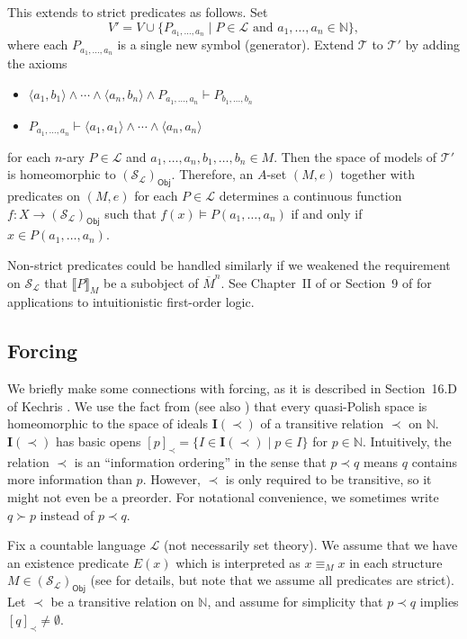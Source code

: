 \documentclass{article}
\theoremstyle{plain}
\def\cal#1{{\mathcal #1}}
\def\IN{{\mathbb N}}
\def\I#1{{{\mathrm{\mathbf I}}(#1)}}
\def\calL{{\cal L}}
\def\calS{{\cal S}}
\def\calT{{\cal T}}
\newcommand{\Obj}{\mathsf{Obj}}
\begin{document}
This extends to strict predicates as follows. Set
\[V' = V\cup\{ P_{a_1,\ldots, a_n} \mid P\in\calL \text{ and } a_1,\ldots,a_n \in\IN\},\]
where each $P_{a_1,\ldots, a_n}$ is a single new symbol (generator). Extend $\calT$ to $\calT'$ by adding the axioms
\begin{itemize}
\item
$\langle a_1,b_1 \rangle\wedge\cdots\wedge \langle a_n,b_n \rangle \wedge P_{a_1,\ldots,a_n}\vdash P_{b_1,\ldots,b_n}$
\item
$P_{a_1,\ldots,a_n} \vdash \langle a_1,a_1 \rangle\wedge\cdots\wedge \langle a_n,a_n\rangle$
\end{itemize}
for each $n$-ary $P\in\calL$ and $a_1,\ldots,a_n,b_1,\ldots,b_n\in M$. Then the space of models of $\calT'$ is homeomorphic to $(\calS_\calL)_\Obj$. Therefore, an $A$-set $(M,e)$ together with predicates on $(M,e)$ for each $P\in\calL$ determines a continuous function $f\colon X \to (\calS_\calL)_\Obj$ such that $f(x) \vDash P(a_1,\ldots,a_n)$ if and only if $x \in P(a_1,\ldots,a_n)$.

Non-strict predicates could be handled similarly if we weakened the requirement on $\calS_\calL$ that $\llbracket P\rrbracket_M$ be a subobject of $\overline{M}^n$. See Chapter~II of \cite{FS79} or Section~9 of \cite{S08} for applications to intuitionistic first-order logic. 


\subsection{Forcing}



We briefly make some connections with forcing, as it is described in Section~16.D of Kechris \cite{ke95}. We use the fact from \cite{DPS} (see also \cite{dbr20}) that every quasi-Polish space is homeomorphic to the space of ideals $\I{\prec}$ of a transitive relation $\prec$ on $\IN$. $\I{\prec}$ has basic opens $[p]_\prec = \{I\in\I{\prec} \mid p\in I\}$ for $p\in\IN$.  Intuitively, the relation $\prec$ is an ``information ordering'' in the sense that $p\prec q$ means $q$ contains more information than $p$. However, $\prec$ is only required to be transitive, so it might not even be a preorder. For notational convenience, we sometimes write $q \succ p$ instead of $p \prec q$.

Fix a countable language $\calL$ (not necessarily set theory). We assume that we have an existence predicate $E(x)$ which is interpreted as $x \equiv_M x$ in each structure $M\in (\calS_\calL)_\Obj$ (see \cite{FS79,S08} for details, but note that we assume all predicates are strict).  Let $\prec$ be a transitive relation on $\IN$, and assume for simplicity that $p \prec q$ implies $[q]_\prec\not=\emptyset$. 
\end{document}
